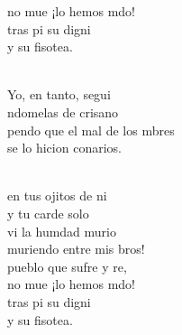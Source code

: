 \begin{cancion}
\begin{chorus}
	no mue ¡lo hemos mdo!\\
	tras pi su digni\\
	y su fisotea.\\
	\end{chorus}%
	\jump\\
	Yo, en tanto, segui\\
	ndomelas de crisano \\
	pendo que el mal de los mbres\\
	se lo hicion  conarios.\\\jump\\
	\begin{chorus}%
	en tus ojitos de ni\\
	y tu carde solo\\
	vi la humdad murio\\
	muriendo entre mis bros!\\
	 pueblo que sufre y re,\\
	no mue ¡lo hemos mdo!\\
	tras pi su digni\\
	y su fisotea.\\
	\end{chorus}%
	\jump\\
\end{cancion}%
